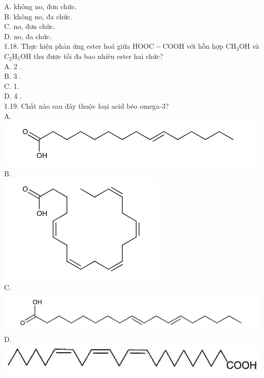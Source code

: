 \documentclass[10pt]{article}
\begin{document}
A. không no, đơn chức.\\
B. không no, đa chức.\\
C. no, đơn chức.\\
D. no, đa chức.\\
1.18. Thực hiện phản ứng ester hoá giữa $\mathrm{HOOC}-\mathrm{COOH}$ với hỗn hợp $\mathrm{CH}_{3} \mathrm{OH}$ và $\mathrm{C}_{2} \mathrm{H}_{5} \mathrm{OH}$ thu được tối đa bao nhiêu ester hai chức?\\
A. 2 .\\
B. 3 .\\
C. 1.\\
D. 4 .\\
1.19. Chất nào sau đây thuộc loại acid béo omega-3?\\
A.\\
\includegraphics{smile-da75591c7049efa93e1a06be2193f4e0ca1c522e}\\
B.\\
\includegraphics{smile-0b21e89fba5e44449c427b77a4680ba4b66c4433}\\
C.\\
\includegraphics{smile-266becb2a8e1358891aec4a5d849a31b0daf609e}\\
D.\\
\includegraphics[max width=\textwidth, center]{2025_10_23_74efce88ce3a451fd6b0g-003}
\end{document}

